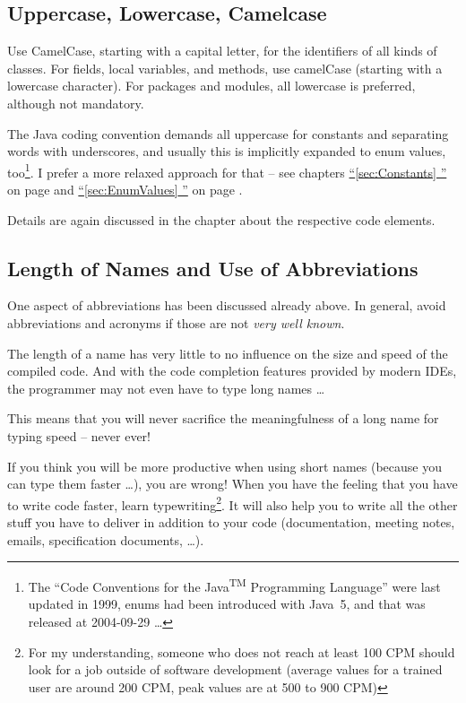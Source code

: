 \documentclass[12pt,a4paper,titlepage, parskip=half, headsepline, footsepline, cleardoubleplain]{scrbook}
\newcommand*{\tqfullvref}[1]{\hyperref[{#1}]{“\ref*{#1} \nameref*{#1}”} on page \pageref{#1}}
\begin{document}
\subsection{Uppercase, Lowercase, Camelcase}
Use CamelCase, starting with a capital letter, for the identifiers of all kinds of classes. For fields, local variables, and methods, use camelCase (starting with a lowercase character). For packages and modules, all lowercase is preferred, although not mandatory.

The Java coding convention \autocite{SUN_CODE_CONVENTIONS} demands all uppercase for constants and separating words with underscores, and usually this is implicitly expanded to enum values, too\footnote{The “Code Conventions for the Java\textsuperscript{TM} Programming Language” \autocite{SUN_CODE_CONVENTIONS} were last updated in 1999, enums had been introduced with Java~5, and that was released at 2004-09-29 …}. I prefer a more relaxed approach for that – see chapters \tqfullvref{sec:Constants} and \tqfullvref{sec:EnumValues}.

Details are again discussed in the chapter about the respective code elements.

\subsection{Length of Names and Use of Abbreviations}\label{sec:LengthOfNamesAndUseOfAbbreviations}
One aspect of abbreviations has been discussed already above. In general, avoid abbreviations and acronyms if those are not \textit{very well known}.

The length of a name has very little to no influence on the size and speed of the compiled code. And with the code completion features provided by modern IDEs, the programmer may not even have to type long names …

This means that you will never sacrifice the meaningfulness of a long name for typing speed – never ever!

If you think you will be more productive when using short names (because you can type them faster …), you are wrong! When you have the feeling that you have to write code faster, learn typewriting\footnote{For my understanding, someone who does not reach at least 100 CPM should look for a job outside of software development (average values for a trained user are around 200 CPM, peak values are at 500 to 900 CPM)}. It will also help you to write all the other stuff you have to deliver in addition to your code (documentation, meeting notes, emails, specification documents, …).
\end{document}

